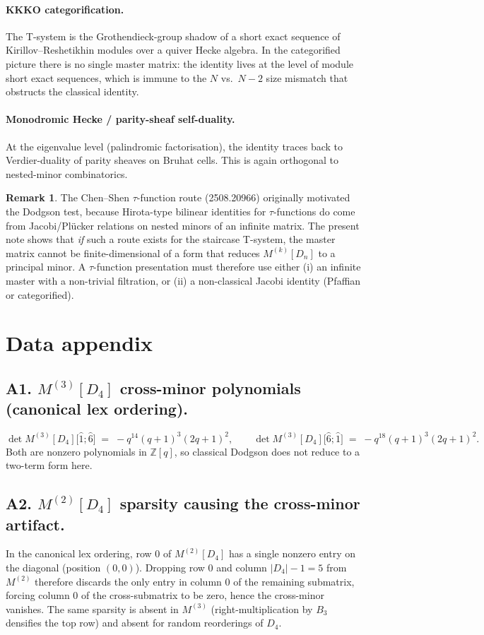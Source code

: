 \documentclass[11pt]{article}
\theoremstyle{definition}
\newtheorem{remark}[theorem]{Remark}
\begin{document}
\paragraph{KKKO categorification.} The T-system is the Grothendieck-group shadow of a short exact sequence of Kirillov--Reshetikhin modules over a quiver Hecke algebra. In the categorified picture there is no single master matrix: the identity lives at the level of module short exact sequences, which is immune to the $N$ vs.\ $N-2$ size mismatch that obstructs the classical identity.

\paragraph{Monodromic Hecke / parity-sheaf self-duality.} At the eigenvalue level (palindromic factorisation), the identity traces back to Verdier-duality of parity sheaves on Bruhat cells. This is again orthogonal to nested-minor combinatorics.

\begin{remark}
The Chen--Shen $\tau$-function route (2508.20966) originally motivated the Dodgson test, because Hirota-type bilinear identities for $\tau$-functions do come from Jacobi/Pl\"ucker relations on nested minors of an infinite matrix. The present note shows that \emph{if} such a route exists for the staircase T-system, the master matrix cannot be finite-dimensional of a form that reduces $M^{(k)}[D_n]$ to a principal minor. A $\tau$-function presentation must therefore use either (i) an infinite master with a non-trivial filtration, or (ii) a non-classical Jacobi identity (Pfaffian or categorified).
\end{remark}

\section{Data appendix}\label{sec:data}

\subsection*{A1. $M^{(3)}[D_4]$ cross-minor polynomials (canonical lex ordering).}
\[
\det M^{(3)}[D_4]\bigl[\hat 1;\hat 6\bigr] \;=\; -q^{14}(q+1)^3(2q+1)^2,\qquad
\det M^{(3)}[D_4]\bigl[\hat 6;\hat 1\bigr] \;=\; -q^{18}(q+1)^3(2q+1)^2.
\]
Both are nonzero polynomials in $\mathbb{Z}[q]$, so classical Dodgson does not reduce to a two-term form here.

\subsection*{A2. $M^{(2)}[D_4]$ sparsity causing the cross-minor artifact.}
In the canonical lex ordering, row $0$ of $M^{(2)}[D_4]$ has a single nonzero entry on the diagonal (position $(0,0)$). Dropping row $0$ and column $|D_4|-1=5$ from $M^{(2)}$ therefore discards the only entry in column $0$ of the remaining submatrix, forcing column $0$ of the cross-submatrix to be zero, hence the cross-minor vanishes. The same sparsity is absent in $M^{(3)}$ (right-multiplication by $B_3$ densifies the top row) and absent for random reorderings of $D_4$.
\end{document}
